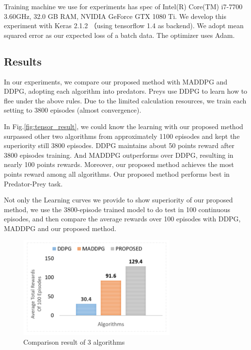 \documentclass[11pt,twocolumn]{jarticle} %
\begin{document}
Training machine we use for experiments has spec of Intel(R) Core(TM) i7-7700 3.60GHz, 32.0 GB RAM, NVIDIA GeForce GTX 1080 Ti. We develop this experiment with Keras 2.1.2 （using tensorflow 1.4 as backend). We adopt mean squared error as our expected loss of a batch data. The optimizer uses Adam\cite{adam}.\par

\subsection{Results}


In our experiments, we compare our proposed method with MADDPG and DDPG, adopting each algorithm into predators. Preys use DDPG to learn how to flee under the above rules. Due to the limited calculation resources, we train each setting to 3800 episodes (almost convergence).  


In Fig.\ref{fig:tensor_result}, we could know the learning with our proposed method surpassed other two algorithms from approximately 1100 episodes and kept the superiority still 3800 episodes. DDPG maintains about 50 points reward after 3800 episodes training. And MADDPG outperforms over DDPG, resulting in nearly 100 points rewards. Moreover, our proposed method achieves the most points reward among all algorithms. Our proposed method performs best in Predator-Prey task. \par



Not only the Learning curves we provide to show superiority of our proposed method, we use the 3800-episode trained model to do test in 100 continuous episodes, and then compare the average rewards over 100 episodes with DDPG, MADDPG and our proposed method.

\begin{figure}[h]
 \begin{center}
  \includegraphics[width=8cm]{imgs/result_table.PNG}
  \caption{ Comparison result of 3 algorithms }
  \label{fig:result}
 \end{center}
\end{figure}
\end{document}

